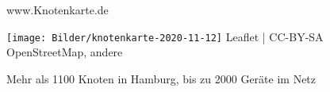 \documentclass[t,aspectratio=169]{beamer}
\begin{document}
  
\appendix
  \begin{frame}[noframenumbering]{\tiny{www.}\huge{Knotenkarte}\tiny{.de}}
          \vspace{-1.5em}
    \begin{center}
      \texttt{[image: Bilder/knotenkarte-2020-11-12]}
      \newline\tiny{Leaflet | \textrm{\textcopyright} CC-BY-SA OpenStreetMap, andere}
    \end{center}
    Mehr als 1100 Knoten in Hamburg, bis zu 2000 Geräte im Netz
  \end{frame}
  
\end{document}
